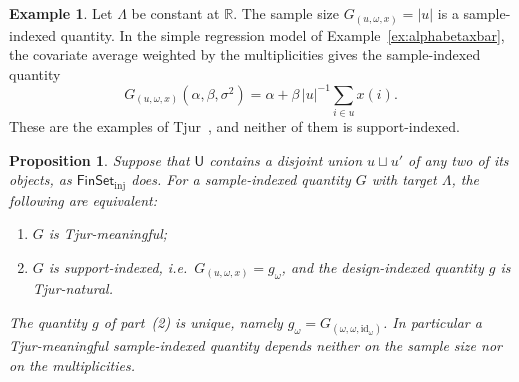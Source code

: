 \documentclass[11pt,a4paper]{article}
\theoremstyle{plain}
\newtheorem{proposition}[theorem]{Proposition}
\theoremstyle{definition}
\newtheorem{example}[theorem]{Example}
\theoremstyle{remark}
\newcommand{\cat}[1]{\mathsf{#1}}
\newcommand{\catU}{\cat{U}}
\newcommand{\FinSet}{\cat{FinSet}}
\newcommand{\id}{\mathrm{id}}
\newcommand{\R}{\mathbb{R}}
\begin{document}
\begin{example}\label{ex:sampleindexed}
Let $\Lambda$ be constant at $\R$. The sample size $G_{(u,\omega,x)} = |u|$ is
a sample-indexed quantity. In the simple regression model of
Example~\ref{ex:alphabetaxbar}, the covariate average weighted by the
multiplicities gives the sample-indexed quantity
\[
G_{(u,\omega,x)}(\alpha,\beta,\sigma^{2}) = \alpha + \beta\,|u|^{-1}
\textstyle\sum_{i \in u} x(i).
\]
These are the examples of Tjur~\cite[pp.~1299--1300]{tjur_discussion_2002},
and neither of them is support-indexed.
\end{example}

\begin{proposition}\label{prop:descent}
Suppose that $\catU$ contains a disjoint union $u \sqcup u'$ of any two of its
objects, as $\FinSet_{\mathrm{inj}}$ does. For a sample-indexed quantity $G$
with target $\Lambda$, the following are equivalent:
\begin{enumerate}
\item $G$ is Tjur-meaningful;
\item $G$ is support-indexed, i.e.\ $G_{(u,\omega,x)} = g_{\omega}$, and the
design-indexed quantity $g$ is Tjur-natural.
\end{enumerate}
The quantity $g$ of part~(2) is unique, namely
$g_{\omega} = G_{(\omega,\omega,\id_{\omega})}$. In particular a
Tjur-meaningful sample-indexed quantity depends neither on the sample size nor
on the multiplicities.
\end{proposition}
\end{document}
